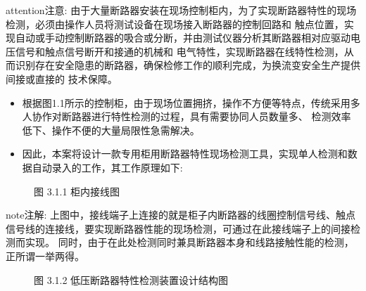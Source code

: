 \documentclass[a4paper,10pt,english]{sphinxmanual}
\begin{document}
\begin{sphinxadmonition}{attention}{注意:}
\sphinxAtStartPar
由于大量断路器安装在现场控制柜内，为了实现断路器特性的现场检测，必须由操作人员将测试设备在现场接入断路器的控制回路和
触点位置，实现自动或手动控制断路器的吸合或分断，并由测试仪器分析其断路器相对应驱动电压信号和触点信号断开和接通的机械和
电气特性，实现断路器在线特性检测，从而识别存在安全隐患的断路器，确保检修工作的顺利完成，为换流变安全生产提供间接或直接的
技术保障。
\end{sphinxadmonition}
\begin{itemize}
\item {} 
\sphinxAtStartPar
根据图1.1所示的控制柜，由于现场位置拥挤，操作不方便等特点，传统采用多人协作对断路器进行特性检测的过程，具有需要协同人员数量多、
检测效率低下、操作不便的大量局限性急需解决。

\item {} 
\sphinxAtStartPar
因此，本案将设计一款专用柜用断路器特性现场检测工具，实现单人检测和数据自动录入的工作，其工作原理如下:

\end{itemize}

\begin{figure}[htbp]
\centering
\capstart

\noindent{}
\caption{图 3.1.1 柜内接线图}\label{\detokenize{work_principle:id4}}\end{figure}

\begin{sphinxadmonition}{note}{注解:}
\sphinxAtStartPar
上图中，接线端子上连接的就是柜子内断路器的线圈控制信号线、触点信号线的连接线，要实现断路器性能的现场检测，可通过在此接线端子上的间接检测而实现。
同时，由于在此处检测同时兼具断路器本身和线路接触性能的检测，正所谓一举两得。
\end{sphinxadmonition}

\begin{figure}[htbp]
\centering
\capstart

\noindent{}
\caption{图 3.1.2 低压断路器特性检测装置设计结构图}\label{\detokenize{work_principle:id5}}\end{figure}
\end{document}
